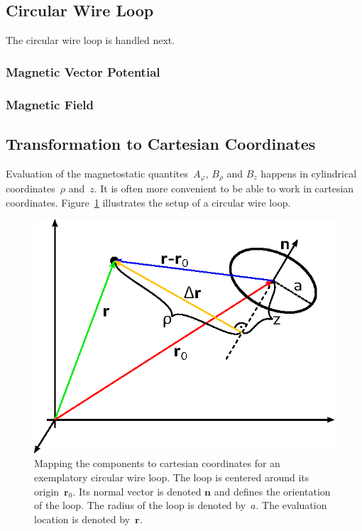 \subsection{Circular Wire Loop}
The circular wire loop is handled next.

\subsubsection{Magnetic Vector Potential}


\subsubsection{Magnetic Field}


\subsection{Transformation to Cartesian Coordinates}
Evaluation of the magnetostatic quantites~$A_\varphi$, $B_\rho$ and $B_z$ happens in cylindrical coordinates~$\rho$ and~$z$.
It is often more convenient to be able to work in cartesian coordinates.
Figure~\ref{fig:mappingToCartesian} illustrates the setup of a circular wire loop.
\begin{figure}[htbp]
 \centering
 \includegraphics{img/MappingToCartesian.eps}
 \caption{Mapping the components to cartesian coordinates for an exemplatory circular wire loop.
          The loop is centered around its origin~$\mathbf{r}_0$.
          Its normal vector is denoted $\mathbf{n}$ and defines the orientation of the loop.
          The radius of the loop is denoted by~$a$.
          The evaluation location is denoted by~$\mathbf{r}$.}
 \label{fig:mappingToCartesian}
\end{figure}

